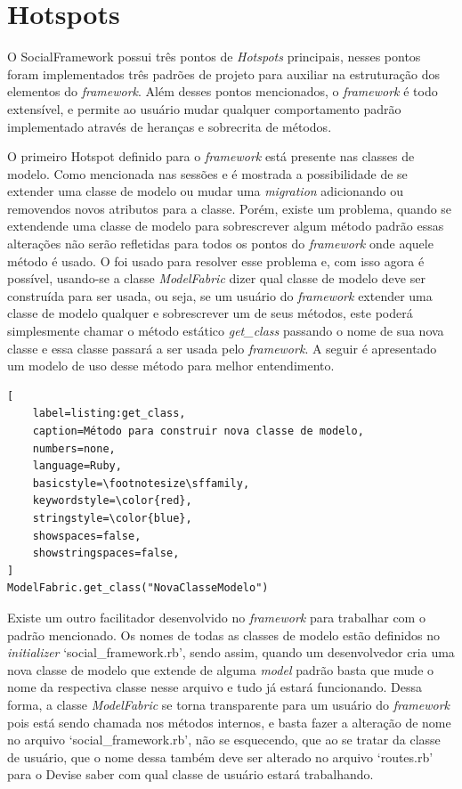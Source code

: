 \section{Hotspots}
\label{sec:hotspots}

O SocialFramework possui três pontos de \textit{Hotspots} principais, nesses pontos foram implementados três padrões de projeto para auxiliar na estruturação dos elementos do \textit{framework}. Além desses pontos mencionados, o \textit{framework} é todo extensível, e permite ao usuário mudar qualquer comportamento padrão implementado através de heranças e sobrecrita de métodos.

O primeiro Hotspot definido para o \textit{framework} está presente nas classes de modelo. Como mencionada nas sessões  e  é mostrada a possibilidade de se extender uma classe de modelo ou mudar uma \textit{migration} adicionando ou removendos novos atributos para a classe. Porém, existe um problema, quando se extendende uma classe de modelo para sobrescrever algum método padrão essas alterações não serão refletidas para todos os pontos do \textit{framework} onde aquele método é usado. O  foi usado para resolver esse problema e, com isso agora é possível, usando-se a classe \textit{ModelFabric} dizer qual classe de modelo deve ser construída para ser usada, ou seja, se um usuário do \textit{framework} extender uma classe de modelo qualquer e sobrescrever um de seus métodos, este poderá simplesmente chamar o método estático \textit{get\_class} passando o nome de sua nova classe e essa classe passará a ser usada pelo \textit{framework}. A seguir é apresentado um modelo de uso desse método para melhor entendimento.

\begin{lstlisting}[
    label=listing:get_class,
    caption=Método para construir nova classe de modelo,
    numbers=none,
    language=Ruby,
    basicstyle=\footnotesize\sffamily,
    keywordstyle=\color{red},
    stringstyle=\color{blue},
    showspaces=false,
    showstringspaces=false,
]
ModelFabric.get_class("NovaClasseModelo")
\end{lstlisting}

Existe um outro facilitador desenvolvido no \textit{framework} para trabalhar com o padrão mencionado. Os nomes de todas as classes de modelo estão definidos no \textit{initializer} `social\_framework.rb', sendo assim, quando um desenvolvedor cria uma nova classe de modelo que extende de alguma \textit{model} padrão basta que mude o nome da respectiva classe nesse arquivo e tudo já estará funcionando. Dessa forma, a classe \textit{ModelFabric} se torna transparente para um usuário do \textit{framework} pois está sendo chamada nos métodos internos, e basta fazer a alteração de nome no arquivo `social\_framework.rb', não se esquecendo, que ao se tratar da classe de usuário, que o nome dessa também deve ser alterado no arquivo `routes.rb' para o Devise saber com qual classe de usuário estará trabalhando.

